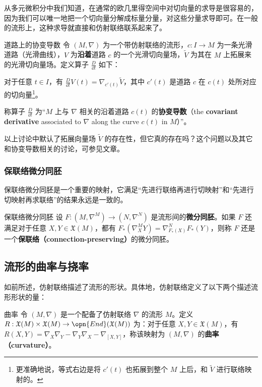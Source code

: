 从多元微积分中我们知道，在通常的欧几里得空间中对切向量的求导是很容易的，因为我们可以唯一地把一个切向量分解成标量分量，对这些分量求导即可。在一般的流形上，这种求导就直接和仿射联络联系起来了。

\begin{definition}{道路上的协变导数}
令 $(M, \nabla)$ 为一个带仿射联络的流形，$c:I\to M$ 为一条光滑道路（光滑曲线），$V$ 为\textbf{沿着}道路 $c$ 的一个光滑切向量场，$\tilde{V}$ 为其在 $M$ 上拓展来的光滑切向量场。定义算子 $\frac{D}{\dd t}$ 如下：

对于任意 $t\in I$，有 $\frac{D}{\dd t}V(t)=\nabla_{c'(t)}\tilde{V}$，其中 $c'(t)$ 是道路 $c$ 在 $c(t)$ 处所对应的切向量\footnote{更准确地说，等式右边是将 $c'(t)$ 也拓展到整个 $M$ 上后，和 $\tilde{V}$ 进行联络映射的。}。

称算子 $\frac{D}{\dd t}$ 为“$M$ 上与 $\nabla$ 相关的沿着道路 $c(t)$ 的\textbf{协变导数}（the \textbf{covariant derivative} associated to $\nabla$ along the curve $c(t)$ in $M$）”。
\end{definition}

以上讨论中默认了拓展向量场 $\tilde{V}$ 的存在性，但它真的存在吗？这个问题以及其它和协变导数相关的讨论，可参见文章。





\subsubsection{保联络微分同胚}

保联络微分同胚是一个重要的映射，它满足“先进行联络再进行切映射”和“先进行切映射再求联络”的结果永远是一致的。

\begin{definition}{保联络微分同胚}
设 $F:(M, \nabla^M)\to (N, \nabla^N)$ 是流形间的\textbf{微分同胚}。如果 $F$ 还满足对于任意 $X, Y\in \mathfrak{X}(M)$，都有 $F_*(\nabla^M_XY)=\nabla^N_{F_*(X)}F_*(Y)$，则称 $F$ 还是一个\textbf{保联络（connection-preserving）}的微分同胚。
\end{definition}




\subsection{流形的曲率与挠率}

如前所述，仿射联络描述了流形的形状。具体地，仿射联络定义了以下两个描述流形形状的量：

\begin{definition}{曲率}
令 $(M, \nabla)$ 是一个配备了仿射联络 $\nabla$ 的流形 $M$。定义 $R:\mathfrak{X}(M)\times\mathfrak{X}(M)\to\opn{End}(\mathfrak{X}(M))$ 为：对于任意 $X, Y\in\mathfrak{X}(M)$，有 $R(X, Y)=\nabla_X\nabla_Y-\nabla_Y\nabla_X-\nabla_{[X, Y]}$，称该映射为 $(M, \nabla)$ 的\textbf{曲率（curvature）}。
\end{definition}

